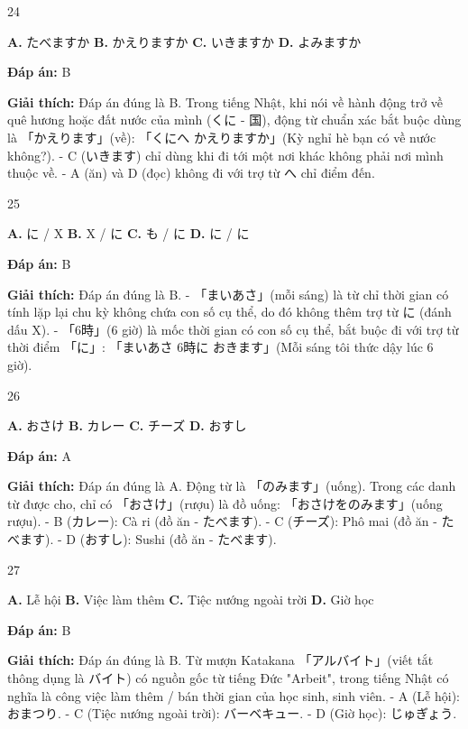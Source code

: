 \documentclass[12pt,a4paper]{report}
\newcommand{\source}[1]{}
\newcommand{\choice}[2]{\textbf{#1.} #2 \quad}
\newcommand{\answer}[1]{\par\textbf{Đáp án:} #1}
\newcommand{\confidence}[1]{}
\newcommand{\explain}[1]{\par\textbf{Giải thích:} #1\vspace{0.5cm}}
\begin{document}
\begin{question}{24}
\source{Q18.jpg}
\choice{A}{たべますか}
\choice{B}{かえりますか}
\choice{C}{いきますか}
\choice{D}{よみますか}
\answer{B}
\confidence{high}
\explain{Đáp án đúng là B. Trong tiếng Nhật, khi nói về hành động trở về quê hương hoặc đất nước của mình (くに - 国), động từ chuẩn xác bắt buộc dùng là 「かえります」(về): 「くにへ かえりますか」(Kỳ nghỉ hè bạn có về nước không?).
- C (いきます) chỉ dùng khi đi tới một nơi khác không phải nơi mình thuộc về.
- A (ăn) và D (đọc) không đi với trợ từ へ chỉ điểm đến.}
\end{question}

\begin{question}{25}
\source{Q21.jpg}
\choice{A}{に / X}
\choice{B}{X / に}
\choice{C}{も / に}
\choice{D}{に / に}
\answer{B}
\confidence{high}
\explain{Đáp án đúng là B.
- 「まいあさ」(mỗi sáng) là từ chỉ thời gian có tính lặp lại chu kỳ không chứa con số cụ thể, do đó không thêm trợ từ に (đánh dấu X).
- 「6時」(6 giờ) là mốc thời gian có con số cụ thể, bắt buộc đi với trợ từ thời điểm 「に」: 「まいあさ 6時に おきます」(Mỗi sáng tôi thức dậy lúc 6 giờ).}
\end{question}

\begin{question}{26}
\source{Q23.jpg}
\choice{A}{おさけ}
\choice{B}{カレー}
\choice{C}{チーズ}
\choice{D}{おすし}
\answer{A}
\confidence{high}
\explain{Đáp án đúng là A. Động từ là 「のみます」(uống). Trong các danh từ được cho, chỉ có 「おさけ」(rượu) là đồ uống: 「おさけをのみます」(uống rượu).
- B (カレー): Cà ri (đồ ăn - たべます).
- C (チーズ): Phô mai (đồ ăn - たべます).
- D (おすし): Sushi (đồ ăn - たべます).}
\end{question}

\begin{question}{27}
\source{Q24.jpg}
\choice{A}{Lễ hội}
\choice{B}{Việc làm thêm}
\choice{C}{Tiệc nướng ngoài trời}
\choice{D}{Giờ học}
\answer{B}
\confidence{high}
\explain{Đáp án đúng là B. Từ mượn Katakana 「アルバイト」(viết tắt thông dụng là バイト) có nguồn gốc từ tiếng Đức "Arbeit", trong tiếng Nhật có nghĩa là công việc làm thêm / bán thời gian của học sinh, sinh viên.
- A (Lễ hội): おまつり.
- C (Tiệc nướng ngoài trời): バーベキュー.
- D (Giờ học): じゅぎょう.}
\end{question}
\end{document}
